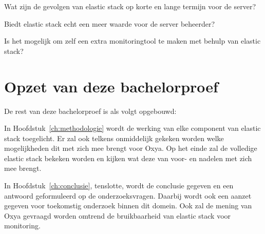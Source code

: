 Wat zijn de gevolgen van elastic stack op korte en lange termijn voor de server?

Biedt elastic stack echt een meer waarde voor de server beheerder?

Is het mogelijk om zelf een extra monitoringtool te maken met behulp van elastic stack?

\section{Opzet van deze bachelorproef}
\label{sec:opzet-bachelorproef}


De rest van deze bachelorproef is als volgt opgebouwd:

In Hoofdstuk~\ref{ch:methodologie} wordt de werking van elke component van elastic stack toegelicht. Er zal ook telkens onmiddelijk gekeken worden welke mogelijkheden dit met zich mee brengt voor Oxya. Op het einde zal de volledige elastic stack bekeken worden en kijken wat deze van voor- en nadelen met zich mee brengt.


In Hoofdstuk~\ref{ch:conclusie}, tenslotte, wordt de conclusie gegeven en een antwoord geformuleerd op de onderzoeksvragen. Daarbij wordt ook een aanzet gegeven voor toekomstig onderzoek binnen dit domein. Ook zal de mening van Oxya gevraagd worden omtrend de bruikbaarheid van elastic stack voor monitoring. 

